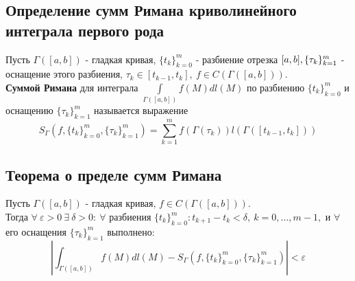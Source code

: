 \documentclass[main]{subfiles}
\begin{document}
\subsection{Определение сумм Римана криволинейного интеграла первого рода}
Пусть $\Gamma([a,b])$ - гладкая кривая, $\{ t_k\}^m_{k=0}$ - разбиение отрезка $[a,b],\\ \{\tau_k\}^m_{k=1}$ -
оснащение этого разбиения, $\tau_k\in[t_{k-1},t_k],\ f\in C(\Gamma([a,b])).$ \\\textbf{Суммой Римана} для интеграла $\int\limits_{\Gamma([a,b])} f(M)dl(M)$ по разбиению $\{ t_k\}_{k=0}^m$
и оснащению $\{\tau_k\}_{k=1}^m$ называется выражение
\[ S_\Gamma (f,\{t_k\}^m_{k=0},\{\tau_k\}^m_{k=1})=\sum\limits_{k=1}^m f(\Gamma(\tau_k))l(\Gamma([t_{k-1},t_k]))\tag{27} \]
\subsection{Теорема о пределе сумм Римана}
Пусть $\Gamma([a,b])$ - гладкая кривая, $f\in C(\Gamma([a,b]))$.\\
Тогда $\forall\ \varepsilon>0\ \exists\ \delta>0:\ \forall $ разбиения $\{t_k\}^m_{k=0}: t_{k+1}-t_k<\delta,\ k=0,\dots,m-1,$ и $\forall$ его оснащения $\{\tau_k\}^m_{k=1}$ выполнено:
\[ |\int_{\Gamma([a,b])} f(M)dl(M)-S_\Gamma(f,\{t_k\}^m_{k=0},\{\tau_k\}^m_{k=1})|<\varepsilon\tag{28} \]
\end{document}
